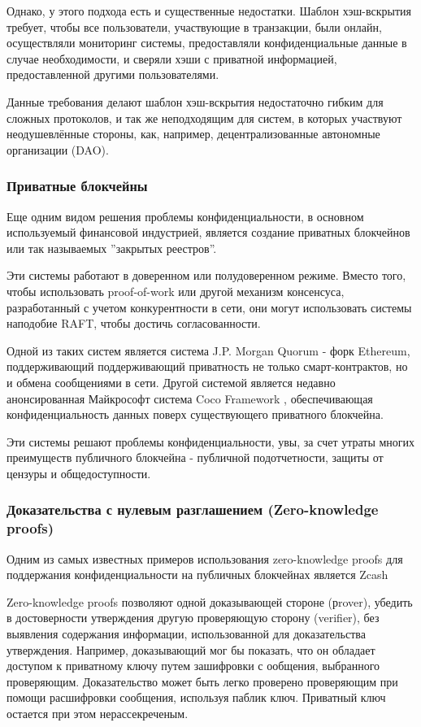 \documentclass[english,russian,11pt]{article}
\begin{document}
Однако, у этого подхода есть и существенные недостатки. Шаблон 
хэш-вскрытия требует, чтобы все пользователи, участвующие в 
транзакции, были онлайн, осуществляли мониторинг системы, предоставляли 
конфиденциальные данные в случае необходимости, и сверяли хэши с 
приватной информацией, предоставленной другими пользователями.

Данные требования делают шаблон хэш-вскрытия недостаточно гибким для 
сложных протоколов, и так же неподходящим для систем, в которых 
участвуют неодушевлённые  стороны, как, например, децентрализованные 
автономные организации (DAO).

\subsubsection{Приватные блокчейны}

Еще одним видом решения проблемы конфиденциальности, в основном 
используемый финансовой индустрией, является создание приватных 
блокчейнов или так называемых ”закрытых реестров”.

Эти системы работают  в доверенном  или полудоверенном  режиме. Вместо 
того, чтобы использовать proof-of-work или другой механизм консенсуса, 
разработанный с учетом конкурентности в сети, они могут использовать 
системы наподобие RAFT, чтобы достичь согласованности.

Одной из таких систем является система J.P. Morgan Quorum \cite{quorum}- 
форк Ethereum, поддерживающий поддерживающий приватность не только 
смарт-контрактов, но и обмена сообщениями в сети. Другой системой 
является недавно анонсированная Майкрософт система Coco Framework \cite{coco}, 
обеспечивающая конфиденциальность данных поверх существующего 
приватного блокчейна.

Эти системы решают проблемы конфиденциальности, увы, за счет утраты 
многих преимуществ публичного блокчейна - публичной подотчетности, 
защиты от цензуры и общедоступности. 

\subsubsection{Доказательства с нулевым разглашением (Zero-knowledge proofs)}

Одним из самых известных примеров использования zero-knowledge proofs 
для поддержания конфиденциальности на публичных блокчейнах является Zcash \cite{zcash} 

Zero-knowledge proofs позволяют одной доказывающей стороне (рrover), 
убедить в достоверности утверждения другую проверяющую сторону 
(verifier), без выявления содержания информации, использованной для 
доказательства утверждения. Например, доказывающий мог бы показать,
что он обладает доступом к приватному ключу путем зашифровки с
ообщения, выбранного проверяющим. Доказательство может быть легко 
проверено проверяющим при помощи расшифровки сообщения, используя 
паблик ключ. Приватный ключ остается при этом нерассекреченым.
\end{document}

